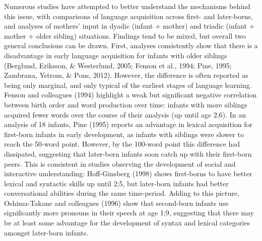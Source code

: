 \documentclass[
  english,
  man,floatsintext]{apa6}
\begin{document}
Numerous studies have attempted to better understand the mechanisms behind this issue, with comparisons of language acquisition across first- and later-borns, and analyses of mothers' input in dyadic (infant + mother) and triadic (infant + mother + older sibling) situations. Findings tend to be mixed, but overall two general conclusions can be drawn. First, analyses consistently show that there is a disadvantage in early language acquisition for infants with older siblings (Berglund, Eriksson, \& Westerlund, 2005; Fenson et al., 1994; Pine, 1995; Zambrana, Ystrom, \& Pons, 2012). However, the difference is often reported as being only marginal, and only typical of the earliest stages of language learning. Fenson and colleagues (1994) highlight a weak but significant negative correlation between birth order and word production over time: infants with more siblings acquired fewer words over the course of their analysis (up until age 2;6). In an analysis of 18 infants, Pine (1995) reports an advantage in lexical acquisition for first-born infants in early development, as infants with siblings were slower to reach the 50-word point. However, by the 100-word point this difference had dissipated, suggesting that later-born infants soon catch up with their first-born peers. This is consistent in studies observing the development of social and interactive understanding: Hoff-Ginsberg (1998) shows first-borns to have better lexical and syntactic skills up until 2;5, but later-born infants had better conversational abilities during the same time-period. Adding to this picture, Oshima-Takane and colleagues (1996) show that second-born infants use significantly more pronouns in their speech at age 1;9, suggesting that there may be at least some advantage for the development of syntax and lexical categories amongst later-born infants.
\end{document}
